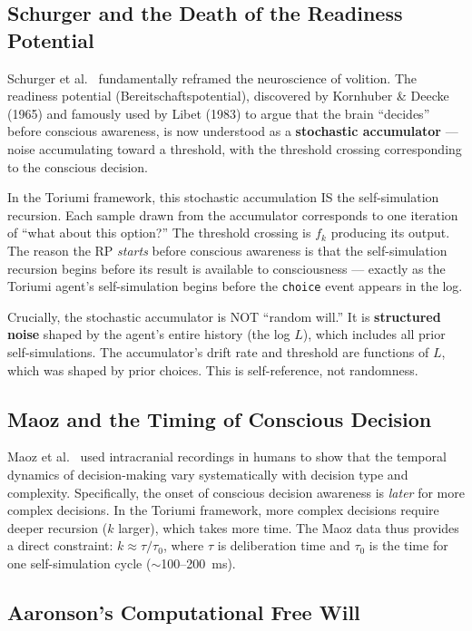 \documentclass[12pt,a4paper]{article}
\theoremstyle{definition}
\theoremstyle{remark}
\begin{document}
\subsection{Schurger and the Death of the Readiness Potential}

Schurger et al.\ \cite{schurger2012, schurger2021} fundamentally reframed the
neuroscience of volition. The readiness potential (Bereitschaftspotential),
discovered by Kornhuber \& Deecke (1965) and famously used by Libet (1983)
\cite{libet1983} to argue that the brain ``decides'' before conscious
awareness, is now understood as a \textbf{stochastic accumulator} --- noise
accumulating toward a threshold, with the threshold crossing corresponding to
the conscious decision.

In the Toriumi framework, this stochastic accumulation IS the self-simulation
recursion. Each sample drawn from the accumulator corresponds to one iteration
of ``what about this option?'' The threshold crossing is $f_k$ producing its
output. The reason the RP \emph{starts} before conscious awareness is that the
self-simulation recursion begins before its result is available to
consciousness --- exactly as the Toriumi agent's self-simulation begins before
the \texttt{choice} event appears in the log.

Crucially, the stochastic accumulator is NOT ``random will.'' It is
\textbf{structured noise} shaped by the agent's entire history (the log $L$),
which includes all prior self-simulations. The accumulator's drift rate and
threshold are functions of $L$, which was shaped by prior choices. This is
self-reference, not randomness.

\subsection{Maoz and the Timing of Conscious Decision}

Maoz et al.\ \cite{maoz2019} used intracranial recordings in humans to show
that the temporal dynamics of decision-making vary systematically with
decision type and complexity. Specifically, the onset of conscious decision
awareness is \emph{later} for more complex decisions. In the Toriumi
framework, more complex decisions require deeper recursion ($k$ larger),
which takes more time. The Maoz data thus provides a direct constraint:
$k \approx \tau / \tau_0$, where $\tau$ is deliberation time and $\tau_0$
is the time for one self-simulation cycle ($\sim$100--200~ms).

\subsection{Aaronson's Computational Free Will}
\end{document}

